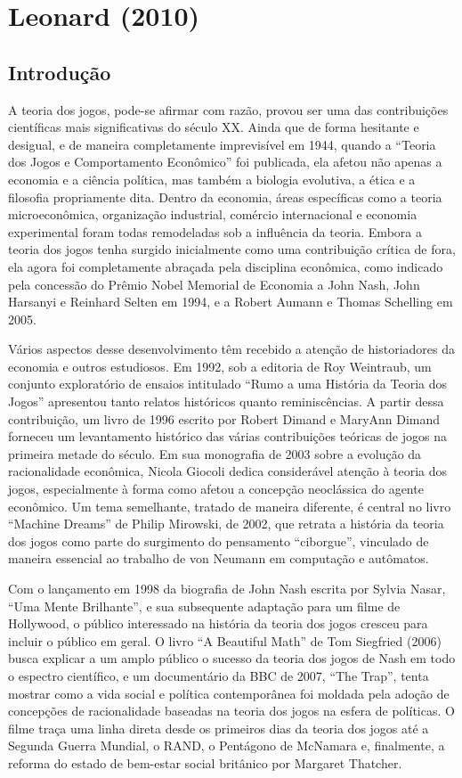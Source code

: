 \documentclass[12pt]{article}
\begin{document}
\section{\textbf{Leonard (2010)}}

\subsection{\textbf{Introdução}}
A teoria dos jogos, pode-se afirmar com razão, provou ser uma das contribuições científicas mais significativas do século XX. Ainda que de forma hesitante e desigual, e de maneira completamente imprevisível em 1944, quando a “Teoria dos Jogos e Comportamento Econômico” foi publicada, ela afetou não apenas a economia e a ciência política, mas também a biologia evolutiva, a ética e a filosofia propriamente dita. Dentro da economia, áreas específicas como a teoria microeconômica, organização industrial, comércio internacional e economia experimental foram todas remodeladas sob a influência da teoria. Embora a teoria dos jogos tenha surgido inicialmente como uma contribuição crítica de fora, ela agora foi completamente abraçada pela disciplina econômica, como indicado pela concessão do Prêmio Nobel Memorial de Economia a John Nash, John Harsanyi e Reinhard Selten em 1994, e a Robert Aumann e Thomas Schelling em 2005.

Vários aspectos desse desenvolvimento têm recebido a atenção de historiadores da economia e outros estudiosos. Em 1992, sob a editoria de Roy Weintraub, um conjunto exploratório de ensaios intitulado “Rumo a uma História da Teoria dos Jogos” apresentou tanto relatos históricos quanto reminiscências. A partir dessa contribuição, um livro de 1996 escrito por Robert Dimand e MaryAnn Dimand forneceu um levantamento histórico das várias contribuições teóricas de jogos na primeira metade do século. Em sua monografia de 2003 sobre a evolução da racionalidade econômica, Nicola Giocoli dedica considerável atenção à teoria dos jogos, especialmente à forma como afetou a concepção neoclássica do agente econômico. Um tema semelhante, tratado de maneira diferente, é central no livro “Machine Dreams” de Philip Mirowski, de 2002, que retrata a história da teoria dos jogos como parte do surgimento do pensamento “ciborgue”, vinculado de maneira essencial ao trabalho de von Neumann em computação e autômatos.

Com o lançamento em 1998 da biografia de John Nash escrita por Sylvia Nasar, “Uma Mente Brilhante”, e sua subsequente adaptação para um filme de Hollywood, o público interessado na história da teoria dos jogos cresceu para incluir o público em geral. O livro “A Beautiful Math” de Tom Siegfried (2006) busca explicar a um amplo público o sucesso da teoria dos jogos de Nash em todo o espectro científico, e um documentário da BBC de 2007, “The Trap”, tenta mostrar como a vida social e política contemporânea foi moldada pela adoção de concepções de racionalidade baseadas na teoria dos jogos na esfera de políticas. O filme traça uma linha direta desde os primeiros dias da teoria dos jogos até a Segunda Guerra Mundial, o RAND, o Pentágono de McNamara e, finalmente, a reforma do estado de bem-estar social britânico por Margaret Thatcher.
\end{document}
